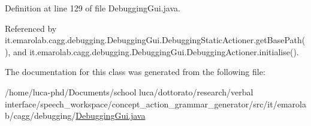 Definition at line 129 of file Debugging\-Gui.\-java.



Referenced by it.\-emarolab.\-cagg.\-debugging.\-Debugging\-Gui.\-Debugging\-Static\-Actioner.\-get\-Base\-Path(), and it.\-emarolab.\-cagg.\-debugging.\-Debugging\-Gui.\-Debugging\-Actioner.\-initialise().



The documentation for this class was generated from the following file\-:\begin{DoxyCompactItemize}
\item 
/home/luca-\/phd/\-Documents/school luca/dottorato/research/verbal interface/speech\-\_\-workspace/concept\-\_\-action\-\_\-grammar\-\_\-generator/src/it/emarolab/cagg/debugging/\hyperlink{DebuggingGui_8java}{Debugging\-Gui.\-java}\end{DoxyCompactItemize}
